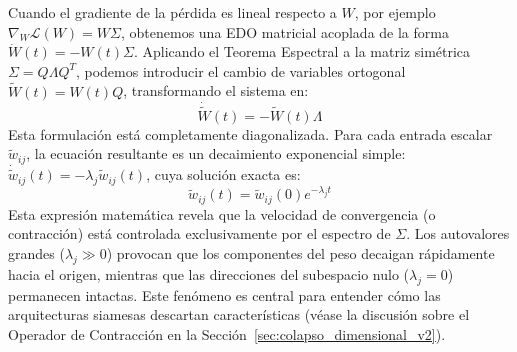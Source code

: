 Cuando el gradiente de la pérdida es lineal respecto a $W$, por ejemplo $\nabla_W \mathcal{L}(W) = W \Sigma$, obtenemos una EDO matricial acoplada de la forma $\dot{W}(t) = -W(t) \Sigma$. Aplicando el Teorema Espectral a la matriz simétrica $\Sigma = Q \Lambda Q^T$, podemos introducir el cambio de variables ortogonal $\tilde{W}(t) = W(t)Q$, transformando el sistema en:
\begin{equation}
    \dot{\tilde{W}}(t) = -\tilde{W}(t)\Lambda
\end{equation}
Esta formulación está completamente diagonalizada. Para cada entrada escalar $\tilde{w}_{ij}$, la ecuación resultante es un decaimiento exponencial simple: $\dot{\tilde{w}}_{ij}(t) = -\lambda_j \tilde{w}_{ij}(t)$, cuya solución exacta es:
\begin{equation}
    \tilde{w}_{ij}(t) = \tilde{w}_{ij}(0) e^{-\lambda_j t}
\end{equation}
Esta expresión matemática revela que la velocidad de convergencia (o contracción) está controlada exclusivamente por el espectro de $\Sigma$. Los autovalores grandes ($\lambda_j \gg 0$) provocan que los componentes del peso decaigan rápidamente hacia el origen, mientras que las direcciones del subespacio nulo ($\lambda_j = 0$) permanecen intactas. Este fenómeno es central para entender cómo las arquitecturas siamesas descartan características (véase la discusión sobre el Operador de Contracción en la Sección~\ref{sec:colapso_dimensional_v2}).
